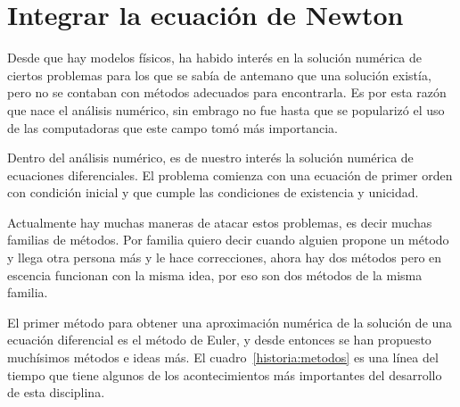 \section{Integrar la ecuación de Newton}
Desde que hay modelos físicos, ha habido interés en la solución numérica de ciertos problemas para los que se sabía de antemano que una solución existía, pero no se contaban con métodos adecuados para encontrarla. Es por esta razón que nace el análisis numérico, sin embrago no fue hasta que se popularizó el uso de las computadoras que este campo tomó más importancia.

Dentro del análisis numérico, es de nuestro interés la solución numérica de ecuaciones diferenciales. El problema comienza con una ecuación de primer orden con condición inicial y que cumple las condiciones de existencia y unicidad.

Actualmente hay muchas maneras de atacar estos problemas, es decir muchas familias de métodos. Por familia quiero decir cuando alguien propone un método y llega otra persona más y le hace correcciones, ahora hay dos métodos pero en escencia funcionan con la misma idea, por eso son dos métodos de la misma familia.

El primer método para obtener una aproximación numérica de la solución de una ecuación diferencial es el método de Euler, y desde entonces se han propuesto muchísimos métodos e ideas más. El cuadro~\ref{historia:metodos} es una línea del tiempo que tiene algunos de los acontecimientos más importantes del desarrollo de esta disciplina.

